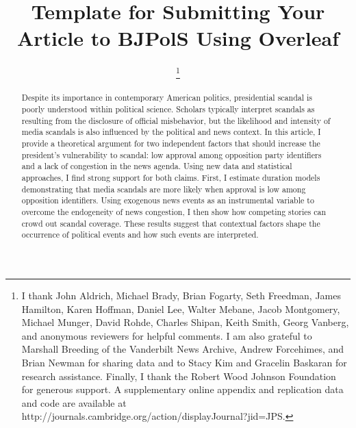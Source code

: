 \documentclass{cupjournal}
\begin{document}


\title{Template for Submitting Your Article to BJPolS Using Overleaf}

\author{\thanks{\noindent I thank John Aldrich, Michael Brady, Brian Fogarty, Seth Freedman, James Hamilton, Karen Hoffman, Daniel Lee, Walter Mebane, Jacob Montgomery, Michael Munger, David Rohde, Charles Shipan, Keith Smith, Georg Vanberg, and anonymous reviewers for helpful comments. I am also grateful to Marshall Breeding of the Vanderbilt News Archive, Andrew Forcehimes, and Brian Newman for sharing data and to Stacy Kim and Gracelin Baskaran for research assistance. Finally, I thank the Robert Wood Johnson Foundation for generous support. A supplementary online appendix and replication data and code are available at http://journals.cambridge.org/action/displayJournal?jid=JPS.}}

\maketitle

\begin{abstract}
Despite its importance in contemporary American politics, presidential scandal is poorly understood within political science. Scholars typically interpret scandals as resulting from the disclosure of official misbehavior, but the likelihood and intensity of media scandals is also influenced by the political and news context. In this article, I provide a theoretical argument for two independent factors that should increase the president's vulnerability to scandal: low approval among opposition party identifiers and a lack of congestion in the news agenda. Using new data and statistical approaches, I find strong support for both claims. First, I estimate duration models demonstrating that media scandals are more likely when approval is low among opposition identifiers. Using exogenous news events as an instrumental variable to overcome the endogeneity of news congestion, I then show how competing stories can crowd out scandal coverage. These results suggest that contextual factors shape the occurrence of political events and how such events are interpreted.
\end{abstract}
\end{document}
